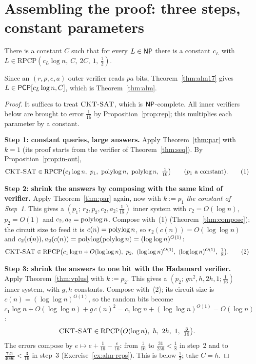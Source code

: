 \section{Assembling the proof: three steps, constant parameters}
\label{sec:assemble}

\begin{theorem}\label{thm:alm17}
There is a constant $C$ such that for every $L\in\mathsf{NP}$ there is a constant $c_L$ with $L\in\mathrm{RPCP}(c_L\log n,\ C,\ 2C,\ 1,\ \tfrac12)$.
\end{theorem}

\noindent
Since an $(r,p,c,a)$ outer verifier reads $pa$ bits, Theorem~\ref{thm:alm17} gives $L\in\mathsf{PCP}[c_L\log n,C]$, which is Theorem~\ref{thm:alm}.

\begin{proof}
It suffices to treat $\textsc{CKT-SAT}$, which is $\mathsf{NP}$-complete.  All inner verifiers below are brought to error $\tfrac1{16}$ by Proposition~\ref{prop:rep}; this multiplies each parameter by a constant.

\medskip
\noindent\textbf{Step 1: constant queries, large answers.}  Apply Theorem~\ref{thm:par} with $k=1$ (its proof starts from the verifier of Theorem~\ref{thm:seq}).  By Proposition~\ref{prop:in-out},
\[
  \sat{CKT-SAT}\in\mathrm{RPCP}\bigl(c_1\log n,\ p_1,\ \polylog n,\ \polylog n,\ \tfrac1{16}\bigr)\qquad(p_1\text{ a constant}).\tag{1}
\]

\medskip
\noindent\textbf{Step 2: shrink the answers by composing with the same kind of verifier.}  Apply Theorem~\ref{thm:par} again, now with $k:=p_1$ \emph{the constant of Step~1}.  This gives a $(p_1;\,r_2,p_2,c_2,a_2;\tfrac1{16})$ inner system with $r_2=O(\log n)$, $p_2=O(1)$ and
$c_2,a_2=\operatorname{polylog} n$.  Compose with~(1) (Theorem~\ref{thm:compose}); the circuit size to feed it is $c(n)=\operatorname{polylog} n$, so $r_2(c(n))=O(\log\log n)$ and $c_2(c(n)),a_2(c(n))=\operatorname{polylog}(\operatorname{polylog} n)=(\log\log n)^{O(1)}$:
\[
  \sat{CKT-SAT}\in\mathrm{RPCP}\bigl(c_1\log n+O(\log\log n),\ p_2,\ (\log\log n)^{O(1)},\ (\log\log n)^{O(1)},\ \tfrac18\bigr).\tag{2}
\]

\medskip
\noindent\textbf{Step 3: shrink the answers to one bit with the Hadamard verifier.}  Apply Theorem~\ref{thm:vplus} with $k:=p_2$.  This gives a $(p_2;\,gn^2,h,2h,1;\tfrac1{16})$ inner system, with $g,h$ constants.  Compose with~(2); its circuit size is $c(n)=(\log\log n)^{O(1)}$, so the random bits become
$c_1\log n+O(\log\log n)+g\,c(n)^2=c_1\log n+(\log\log n)^{O(1)}=O(\log n)$:
\[
  \textsc{CKT-SAT}\in\mathrm{RPCP}\bigl(O(\log n),\ h,\ 2h,\ 1,\ \tfrac{3}{16}\bigr).
\]
The errors compose by $e\mapsto e+\tfrac1{16}-\tfrac e{16}$: from $\tfrac1{16}$ to $\tfrac{31}{256}<\tfrac18$ in step~2 and to $\tfrac{721}{4096}<\tfrac3{16}$ in step~3 (Exercise~\ref{ex:alm-reps}).  This is below $\tfrac12$; take $C=h$.
\end{proof}

